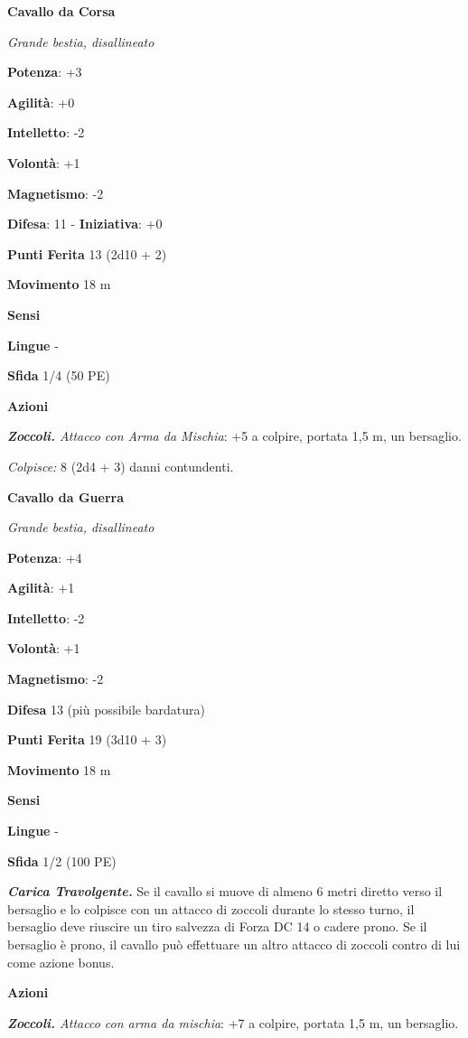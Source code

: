 \begin{multicols}{2}
\textbf{Cavallo da Corsa}

\emph{Grande bestia, disallineato}

\textbf{Potenza}: +3

\textbf{Agilità}: +0

\textbf{Intelletto}: -2

\textbf{Volontà}: +1

\textbf{Magnetismo}: -2

\textbf{Difesa}: 11 - \textbf{Iniziativa}: +0

\textbf{Punti Ferita} 13 (2d10 + 2)

\textbf{Movimento} 18 m

\textbf{Sensi} 

\textbf{Lingue} -

\textbf{Sfida} 1/4 (50 PE)

\textbf{Azioni}

\emph{\textbf{Zoccoli.} Attacco con Arma da Mischia}: +5 a colpire,
portata 1,5 m, un bersaglio.

\emph{Colpisce:} 8 (2d4 + 3) danni contundenti.



\textbf{Cavallo da Guerra}

\emph{Grande bestia, disallineato}

\textbf{Potenza}: +4

\textbf{Agilità}: +1

\textbf{Intelletto}: -2

\textbf{Volontà}: +1

\textbf{Magnetismo}: -2

\textbf{Difesa} 13 (più possibile bardatura)

\textbf{Punti Ferita} 19 (3d10 + 3)

\textbf{Movimento} 18 m

\textbf{Sensi} 

\textbf{Lingue} -

\textbf{Sfida} 1/2 (100 PE)

\emph{\textbf{Carica Travolgente.}} Se il cavallo si muove di almeno 6
metri diretto verso il bersaglio e lo colpisce con un attacco di zoccoli
durante lo stesso turno, il bersaglio deve riuscire un tiro salvezza di Forza DC 14 o cadere prono. Se il bersaglio è prono, il cavallo può
effettuare un altro attacco di zoccoli contro di lui come azione bonus.

\textbf{Azioni}

\emph{\textbf{Zoccoli.} Attacco con arma da mischia}: +7 a colpire,
portata 1,5 m, un bersaglio.


\end{multicols}
